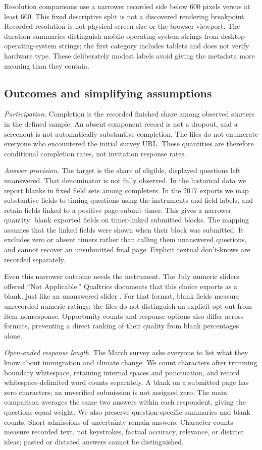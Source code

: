 \documentclass[11pt]{article}
\begin{document}
Resolution comparisons use a narrower recorded side below 600 pixels versus at least 600. This fixed descriptive split is not a discovered rendering breakpoint. Recorded resolution is not physical screen size or the browser viewport. The duration summaries distinguish mobile operating-system strings from desktop operating-system strings; the first category includes tablets and does not verify hardware type. These deliberately modest labels avoid giving the metadata more meaning than they contain.

\subsection{Outcomes and simplifying assumptions}

\emph{Participation.} Completion is the recorded finished share among observed starters in the defined sample. An absent component record is not a dropout, and a screenout is not automatically substantive completion. The files do not enumerate everyone who encountered the initial survey URL. These quantities are therefore conditional completion rates, not invitation response rates.

\emph{Answer provision.} The target is the share of eligible, displayed questions left unanswered. That denominator is not fully observed. In the historical data we report blanks in fixed field sets among completers. In the 2017 exports we map substantive fields to timing questions using the instruments and field labels, and retain fields linked to a positive page-submit timer. This gives a narrower quantity: blank exported fields on timer-linked submitted blocks. The mapping assumes that the linked fields were shown when their block was submitted. It excludes zero or absent timers rather than calling them unanswered questions, and cannot recover an unsubmitted final page. Explicit textual don't-knows are recorded separately.

Even this narrower outcome needs the instrument. The July numeric sliders offered ``Not Applicable.'' Qualtrics documents that this choice exports as a blank, just like an unanswered slider \citep{qualtricsslider}. For that format, blank fields measure unrecorded numeric ratings; the files do not distinguish an explicit opt-out from item nonresponse. Opportunity counts and response options also differ across formats, preventing a direct ranking of their quality from blank percentages alone.

\emph{Open-ended response length.} The March survey asks everyone to list what they know about immigration and climate change. We count characters after trimming boundary whitespace, retaining internal spaces and punctuation, and record whitespace-delimited word counts separately. A blank on a submitted page has zero characters; an unverified submission is not assigned zero. The main comparison averages the same two answers within each respondent, giving the questions equal weight. We also preserve question-specific summaries and blank counts. Short admissions of uncertainty remain answers. Character counts measure recorded text, not keystrokes, factual accuracy, relevance, or distinct ideas; pasted or dictated answers cannot be distinguished.
\end{document}
